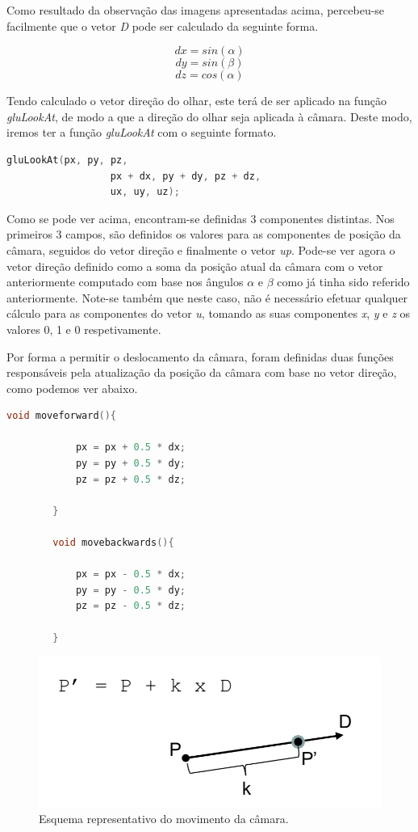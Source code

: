 \documentclass[a4paper]{article}
\begin{document}
Como resultado da observação das imagens apresentadas acima, percebeu-se facilmente que o vetor \textit{D} pode ser calculado da seguinte forma.

\[ dx = sin(\alpha) \]
\[ dy = sin(\beta) \]
\[ dz = cos(\alpha) \]

Tendo calculado o vetor direção do olhar, este terá de ser aplicado na função \textit{gluLookAt}, de modo a que a direção do olhar seja aplicada à câmara. Deste modo, iremos ter a função \textit{gluLookAt} com o seguinte formato.

\begin{lstlisting}[language=C++, caption=Definição da função \textit{gluLookAt}.]
        gluLookAt(px, py, pz,
                  px + dx, py + dy, pz + dz,
                  ux, uy, uz);
\end{lstlisting}

Como se pode ver acima, encontram-se definidas 3 componentes distintas. Nos primeiros 3 campos, são definidos os valores para as componentes de posição da câmara, seguidos do vetor direção e finalmente o vetor \textit{up}. Pode-se ver agora o vetor direção definido como a soma da posição atual da câmara com o vetor anteriormente computado com base nos ângulos $\alpha$ e $\beta$ como já tinha sido referido anteriormente. Note-se também que neste caso, não é necessário efetuar qualquer cálculo para as componentes do vetor \textit{u}, tomando as suas componentes \textit{x}, \textit{y} e \textit{z} os valores 0, 1 e 0 respetivamente.

Por forma a permitir o deslocamento da câmara, foram definidas duas funções responsáveis pela atualização da posição da câmara com base no vetor direção, como podemos ver abaixo.

\begin{lstlisting}[language=C++, caption=Definição das funções responsáveis pelo movimento para frente e trás da câmara.]
        void moveforward(){

            px = px + 0.5 * dx;
            py = py + 0.5 * dy;
            pz = pz + 0.5 * dz;

        }

        void movebackwards(){

            px = px - 0.5 * dx;
            py = py - 0.5 * dy;
            pz = pz - 0.5 * dz;

        }
\end{lstlisting}

\begin{figure}[!h]
    \centering
    \includegraphics[width=0.5\linewidth]{referencial_FPS2.png}
    \caption{Esquema representativo do movimento da câmara.}
    \label{fig:ref_FPS}
\end{figure}
\end{document}
